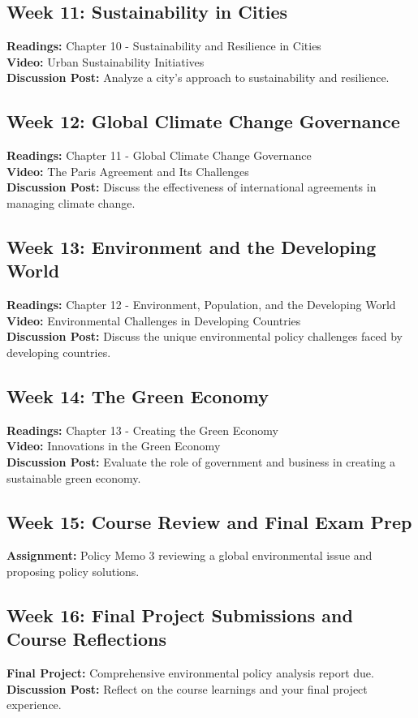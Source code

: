 \documentclass[12pt, letterpaper]{article}
\begin{document}
\subsection*{Week 11: Sustainability in Cities}
\textbf{Readings:} Chapter 10 - Sustainability and Resilience in Cities\\
\textbf{Video:} Urban Sustainability Initiatives\\
\textbf{Discussion Post:} Analyze a city’s approach to sustainability and resilience.

\subsection*{Week 12: Global Climate Change Governance}
\textbf{Readings:} Chapter 11 - Global Climate Change Governance\\
\textbf{Video:} The Paris Agreement and Its Challenges\\
\textbf{Discussion Post:} Discuss the effectiveness of international agreements in managing climate change.

\subsection*{Week 13: Environment and the Developing World}
\textbf{Readings:} Chapter 12 - Environment, Population, and the Developing World\\
\textbf{Video:} Environmental Challenges in Developing Countries\\
\textbf{Discussion Post:} Discuss the unique environmental policy challenges faced by developing countries.

\subsection*{Week 14: The Green Economy}
\textbf{Readings:} Chapter 13 - Creating the Green Economy\\
\textbf{Video:} Innovations in the Green Economy\\
\textbf{Discussion Post:} Evaluate the role of government and business in creating a sustainable green economy.

\subsection*{Week 15: Course Review and Final Exam Prep}
\textbf{Assignment:} Policy Memo 3 reviewing a global environmental issue and proposing policy solutions.

\subsection*{Week 16: Final Project Submissions and Course Reflections}
\textbf{Final Project:} Comprehensive environmental policy analysis report due.\\
\textbf{Discussion Post:} Reflect on the course learnings and your final project experience.
\end{document}
